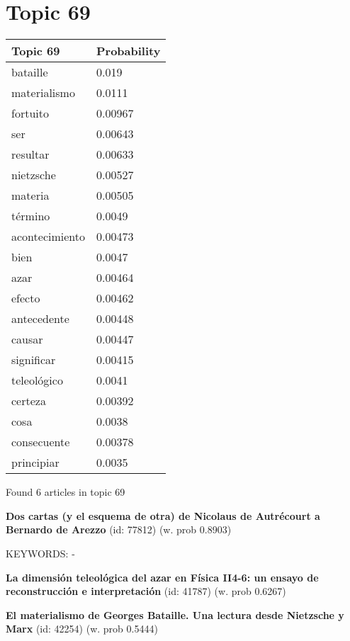 \documentclass{article}
\begin{document}
\vfill
\newpage


\centering
\thispagestyle{empty}
\section*{Topic 69}\vfill
\begin{tabular}{ll}
\toprule
       Topic 69 & Probability \\
\midrule
       bataille &       0.019 \\
   materialismo &      0.0111 \\
       fortuito &     0.00967 \\
            ser &     0.00643 \\
       resultar &     0.00633 \\
      nietzsche &     0.00527 \\
        materia &     0.00505 \\
        término &      0.0049 \\
 acontecimiento &     0.00473 \\
           bien &      0.0047 \\
           azar &     0.00464 \\
         efecto &     0.00462 \\
    antecedente &     0.00448 \\
         causar &     0.00447 \\
     significar &     0.00415 \\
    teleológico &      0.0041 \\
        certeza &     0.00392 \\
           cosa &      0.0038 \\
    consecuente &     0.00378 \\
     principiar &      0.0035 \\
\bottomrule
\end{tabular}

\vfill
Found 6 articles in topic 69
\vfill

\textbf{Dos cartas (y el esquema de otra) de Nicolaus de Autrécourt a Bernardo de Arezzo} (id: 77812)
 (w. prob 0.8903)


KEYWORDS:
-
\vfill

\textbf{La dimensión teleológica del azar en Física II4-6: un ensayo de  reconstrucción e interpretación} (id: 41787)
 (w. prob 0.6267)
\vfill

\textbf{El materialismo de Georges Bataille. Una lectura desde Nietzsche y Marx} (id: 42254)
 (w. prob 0.5444)
\end{document}
